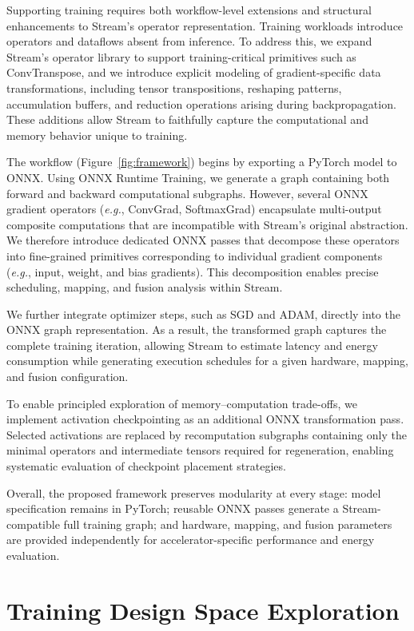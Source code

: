 \documentclass[lettersize,journal]{IEEEtran}
\begin{document}
Supporting training requires both workflow-level extensions and structural enhancements to Stream’s operator representation. Training workloads introduce operators and dataflows absent from inference. To address this, we expand Stream’s operator library to support training-critical primitives such as ConvTranspose, and we introduce explicit modeling of gradient-specific data transformations, including tensor transpositions, reshaping patterns, accumulation buffers, and reduction operations arising during backpropagation. These additions allow Stream to faithfully capture the computational and memory behavior unique to training.

The workflow (Figure~\ref{fig:framework}) begins by exporting a PyTorch model to ONNX. Using ONNX Runtime Training, we generate a graph containing both forward and backward computational subgraphs. However, several ONNX gradient operators (\emph{e.g.}, ConvGrad, SoftmaxGrad) encapsulate multi-output composite computations that are incompatible with Stream’s original abstraction. We therefore introduce dedicated ONNX passes that decompose these operators into fine-grained primitives corresponding to individual gradient components (\emph{e.g.}, input, weight, and bias gradients). This decomposition enables precise scheduling, mapping, and fusion analysis within Stream.

We further integrate optimizer steps, such as SGD and ADAM, directly into the ONNX graph representation. As a result, the transformed graph captures the complete training iteration, allowing Stream to estimate latency and energy consumption while generating execution schedules for a given hardware, mapping, and fusion configuration.

To enable principled exploration of memory–computation trade-offs, we implement activation checkpointing as an additional ONNX transformation pass. Selected activations are replaced by recomputation subgraphs containing only the minimal operators and intermediate tensors required for regeneration, enabling systematic evaluation of checkpoint placement strategies.

Overall, the proposed framework preserves modularity at every stage: model specification remains in PyTorch; reusable ONNX passes generate a Stream-compatible full training graph; and hardware, mapping, and fusion parameters are provided independently for accelerator-specific performance and energy evaluation.

\section{Training Design Space Exploration}\label{lb:SearchSpace}
\end{document}
